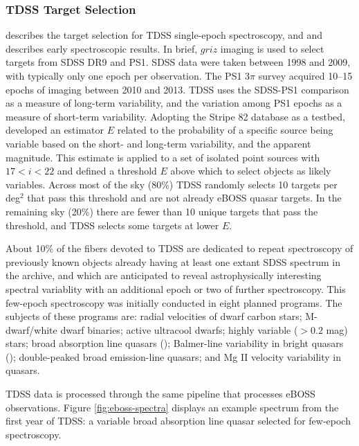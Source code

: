 \subsubsection{TDSS Target Selection} 
\label{sec:tdss:targeting}

\citet{morganson15a} describes the target selection for TDSS single-epoch
spectroscopy, and \citet{ruan16a} and describes early spectroscopic
results.  In brief, $griz$ imaging is used to select targets from SDSS
DR9 and PS1. SDSS data were taken between 1998 and 2009, with
typically only one epoch per observation. The PS1 3$\pi$ survey
acquired 10--15 epochs of imaging between 2010 and 2013.  TDSS uses
the SDSS-PS1 comparison as a measure of long-term variability, and the
variation among PS1 epochs as a measure of short-term
variability. Adopting the Stripe 82 database as a
testbed, \citet{morganson15a} developed an estimator $E$ related to
the probability of a specific source being variable based on the
short- and long-term variability, and the apparent magnitude. This
estimate is applied to a set of isolated point sources with $17<i<22$
and defined a threshold $E$ above which to select objects as likely
variables. Across most of the sky (80\%) TDSS randomly selects 10 targets
per deg$^2$ that pass this threshold and are not already eBOSS quasar
targets. In the remaining sky (20\%) there are fewer than 10 unique
targets that pass the threshold, and TDSS selects some targets at lower
$E$.

About 10\% of the fibers devoted to TDSS are dedicated to repeat
spectroscopy of previously known objects already having at least one
extant SDSS spectrum in the archive, and which are anticipated to
reveal astrophysically interesting spectral variablity with an
additional epoch or two of further spectroscopy. This few-epoch
spectroscopy was initially conducted in eight planned programs. The
subjects of these programs are: radial velocities of dwarf carbon
stars; M-dwarf/white dwarf binaries; active ultracool dwarfs; highly
variable ($>0.2$ mag) stars; broad absorption line quasars
(\citealt{grier16a}); Balmer-line variability in bright quasars
(\citealt{runnoe16a}); double-peaked broad emission-line quasars; and
Mg II velocity variability in quasars.

TDSS data is processed through the same pipeline that processes eBOSS
observations. Figure \ref{fig:eboss-spectra} displays an example
spectrum from the first year of TDSS: a variable broad absorption line
quasar selected for few-epoch spectroscopy.
